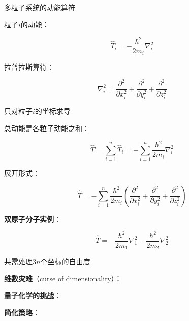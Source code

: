\documentclass[aspectratio=169, 10pt]{beamer}
\begin{document}
\begin{frame}{多粒子系统的动能算符}
{    
    \begin{iqbitemize}
    \item 粒子$i$的动能：
    \end{iqbitemize}
      \[
        \hat{T}_i = -\dfrac{\hbar^2}{2m_i}\nabla_i^2
      \]
    \begin{iqbitemize}
    \item 拉普拉斯算符：
    \end{iqbitemize}
      \[
        \nabla_i^2 = \dfrac{\partial^2}{\partial x_i^2} + \dfrac{\partial^2}{\partial y_i^2} + \dfrac{\partial^2}{\partial z_i^2}
      \]
    \begin{iqbitemize}
    \item 只对粒子$i$的坐标求导
    \end{iqbitemize}
  }{
    \begin{iqbitemize}
    \item 总动能是各粒子动能之和：
    \end{iqbitemize}
      \[
        \hat{T} = \sum_{i=1}^{n}\hat{T}_i = -\sum_{i=1}^{n}\dfrac{\hbar^2}{2m_i}\nabla_i^2
      \]
    \begin{iqbitemize}
    \item 展开形式：
    \end{iqbitemize}
      \[
        \hat{T} = -\sum_{i=1}^{n}\dfrac{\hbar^2}{2m_i}\left(\dfrac{\partial^2}{\partial x_i^2} + \dfrac{\partial^2}{\partial y_i^2} + \dfrac{\partial^2}{\partial z_i^2}\right)
      \]
    \begin{iqbitemize}
    \item \textbf{双原子分子实例}：
    \end{iqbitemize}
      \[
        \hat{T} = -\dfrac{\hbar^2}{2m_1}\nabla_1^2 - \dfrac{\hbar^2}{2m_2}\nabla_2^2
      \]
    \begin{iqbitemize}
    \item 共需处理$3n$个坐标的自由度
    \end{iqbitemize}
    \iqbsmallsep

    \begin{iqbitemize}
    \item \textbf{维数灾难}（curse of dimensionality）：
    \item \textbf{量子化学的挑战}：
    \item \textbf{简化策略}：
    \end{iqbitemize}
    \iqbtinysep

  }
\end{frame}
\end{document}

